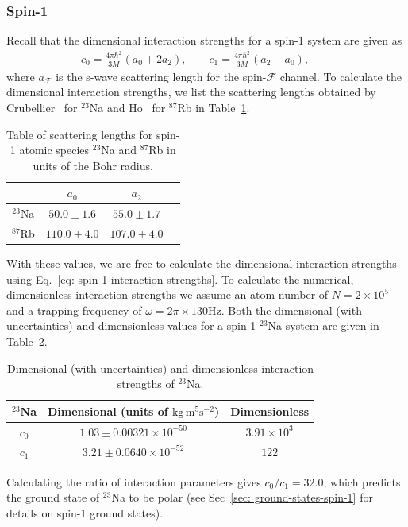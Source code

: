 \subsubsection{Spin-1}
Recall that the dimensional interaction strengths for a spin-1 system are given
as
\begin{align}\label{eq: spin-1-interaction-strengths}
    c_0 = \frac{4\pi\hbar^2}{3M}(a_0+2a_2), \qquad
    c_1 = \frac{4\pi\hbar^2}{3M}(a_2-a_0), \qquad
\end{align}
where \(a_\mathcal{F}\) is the s-wave scattering length for the
spin-\(\mathcal{F}\) channel.
To calculate the dimensional interaction strengths, we list the scattering
lengths obtained by Crubellier~\cite{Crubellier1999} for \( ^{23}\)Na and
Ho~\cite{Ho1998} for \( ^{87}\)Rb in
Table~\ref{table: scaterring-lengths-spin-1}.
\begin{table}[htbp]
    \centering
    \begin{tabular}{ cccc } 
     \toprule
      & \(a_0\) & \(a_2\) \\
      \midrule
      \( ^{23}\)Na & \(50.0\pm 1.6\) & \(55.0\pm 1.7\) \\ 
      \( ^{87}\)Rb & \(110.0\pm 4.0\) & \(107.0\pm 4.0\) \\
      \bottomrule
    \end{tabular}
    \caption{\label{table: scaterring-lengths-spin-1}Table of scattering lengths
    for spin-1 atomic species \( ^{23}\)Na and \( ^{87}\)Rb in units of the Bohr
    radius.}
\end{table}
With these values, we are free to calculate the dimensional interaction
strengths using Eq.~\eqref{eq: spin-1-interaction-strengths}.
To calculate the numerical, dimensionless interaction strengths we assume an
atom number of \(N = 2\times10^5\) and a trapping frequency of
\(\omega = 2\pi \times 130\)Hz.
Both the dimensional (with uncertainties) and dimensionless values for a spin-1
\( ^{23}\)Na system are given in Table~\ref{table: spin-1-interactions-sodium}.
\begin{table}[!htbp]
    \centering
    \begin{tabular}{ccc}
        \toprule
        \( ^{23}\)Na & Dimensional (units of \(\text{kg}\, \text{m}^5
        \text{s}^{-2}\)) & Dimensionless \\
        \midrule
        \(c_0\) & \(1.03 \pm 0.00321 \times 10^{-50}\) & \(3.91\times10^3\) \\
        \(c_1\) & \(3.21 \pm 0.0640 \times 10^{-52}\) & \(122\) \\
        \bottomrule
    \end{tabular}
    \caption{\label{table: spin-1-interactions-sodium}Dimensional (with
    uncertainties) and dimensionless interaction strengths of \( ^{23}\)Na.}
\end{table}
Calculating the ratio of interaction parameters gives \(c_0/c_1=32.0 \),
which predicts the ground state of \( ^{23}\)Na to be polar (see
Sec~\ref{sec: ground-states-spin-1} for details on spin-1 ground states).

